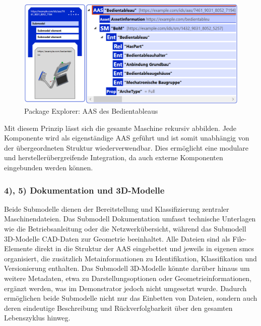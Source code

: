 \begin{figure}[htbp]
    \centering
        \includegraphics[width=1\textwidth]{Bilder/ErgebnissePackageExplorer/BedientableauTest.PNG}
    \caption{Package Explorer: AAS des Bedientableaus}
    \label{fig:AASBedientableau}
\end{figure}


Mit diesem Prinzip lässt sich die gesamte Maschine rekursiv abbilden. 
Jede Komponente wird als eigenständige AAS geführt und ist somit unabhängig von der übergeordneten Struktur wiederverwendbar. 
Dies ermöglicht eine modulare und herstellerübergreifende Integration, da auch externe Komponenten eingebunden werden können.

\subsubsection*{4), 5) Dokumentation und 3D-Modelle}
\vspace{-0.5em}

Beide Submodelle dienen der Bereitstellung und Klassifizierung zentraler Maschinendateien. 
Das Submodell Dokumentation umfasst technische Unterlagen wie die Betriebsanleitung oder die Netzwerkübersicht, während das Submodell 3D-Modelle CAD-Daten zur Geometrie beeinhaltet. 
Alle Dateien sind als File-Elemente direkt in die Struktur der AAS eingebettet und jeweils in eigenen \acsp{smc} organisiert, die zusätzlich Metainformationen zu Identifikation, Klassifikation und Versionierung enthalten. 
Das Submodell 3D-Modelle könnte darüber hinaus um weitere Metadaten, etwa zu Darstellungsoptionen oder Geometrieinformationen, ergänzt werden, was im Demonstrator jedoch nicht umgesetzt wurde. 
Dadurch ermöglichen beide Submodelle nicht nur das Einbetten von Dateien, sondern auch deren eindeutige Beschreibung und Rückverfolgbarkeit über den gesamten Lebenszyklus hinweg.

